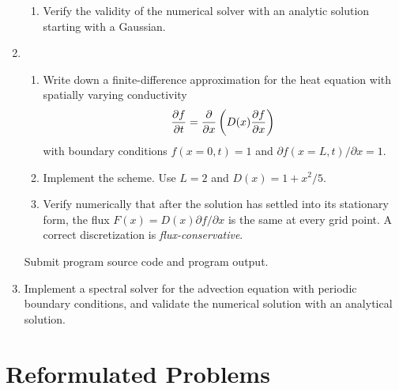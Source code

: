 \documentclass{article}
\begin{document}
\begin{enumerate}
\begin{enumerate}
\item
  Verify the validity of the numerical solver with an analytic solution starting with a Gaussian.

\end{enumerate}


\item
  \begin{enumerate}\setlength{\itemsep}{0pt}
    \item
  Write down a finite-difference approximation for the heat equation with spatially varying conductivity
  \[
  {\partial f \over \partial t} = {\partial \over \partial x} \left( D(x) {\partial f \over \partial x} \right) 
  \]
  with boundary conditions $f(x=0,t)=1$ and $\partial f(x=L,t)/\partial x = 1$.

  \item
    Implement the scheme. Use $L=2$ and $D(x)=1+x^2/5$.

  \item Verify numerically that after the solution has settled into its stationary form, the flux $F(x) = D(x)\partial f/\partial x$ is the same at every grid point.  A correct discretization is {\it flux-conservative}.

  \end{enumerate}
Submit program source code and program output.
  
  \item Implement a spectral solver for the advection equation with periodic boundary conditions, and validate the numerical solution with an analytical solution.


\end{enumerate}




\newpage 
\section{Reformulated Problems}
\label{chap:reform}
\end{document}
